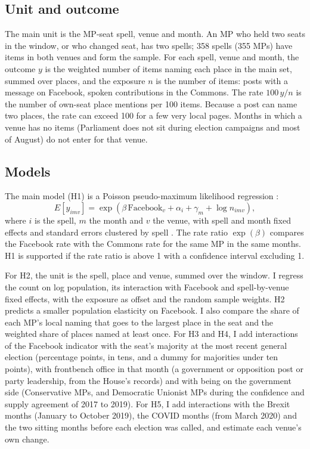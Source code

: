 \documentclass[11pt,a4paper]{article}
\begin{document}
\subsection{Unit and outcome}
The main unit is the MP-seat spell, venue and month. An MP who held two seats in the window, or who changed seat, has two spells; 358 spells (355 MPs) have items in both venues and form the sample. For each spell, venue and month, the outcome $y$ is the weighted number of items naming each place in the main set, summed over places, and the exposure $n$ is the number of items: posts with a message on Facebook, spoken contributions in the Commons. The rate $100\,y/n$ is the number of own-seat place mentions per 100 items. Because a post can name two places, the rate can exceed 100 for a few very local pages. Months in which a venue has no items (Parliament does not sit during election campaigns and most of August) do not enter for that venue.

\subsection{Models}
The main model (H1) is a Poisson pseudo-maximum likelihood regression \citep{santos2006,correia2020}:
\begin{equation}
E[y_{imv}] = \exp(\beta\,\mathrm{Facebook}_v + \alpha_i + \gamma_m + \log n_{imv}),
\end{equation}
where $i$ is the spell, $m$ the month and $v$ the venue, with spell and month fixed effects and standard errors clustered by spell \citep{cameron2015,abadie2023}. The rate ratio $\exp(\beta)$ compares the Facebook rate with the Commons rate for the same MP in the same months. H1 is supported if the rate ratio is above 1 with a confidence interval excluding 1.

For H2, the unit is the spell, place and venue, summed over the window. I regress the count on log population, its interaction with Facebook and spell-by-venue fixed effects, with the exposure as offset and the random sample weights. H2 predicts a smaller population elasticity on Facebook. I also compare the share of each MP's local naming that goes to the largest place in the seat and the weighted share of places named at least once. For H3 and H4, I add interactions of the Facebook indicator with the seat's majority at the most recent general election (percentage points, in tens, and a dummy for majorities under ten points), with frontbench office in that month (a government or opposition post or party leadership, from the House's records) and with being on the government side (Conservative MPs, and Democratic Unionist MPs during the confidence and supply agreement of 2017 to 2019). For H5, I add interactions with the Brexit months (January to October 2019), the COVID months (from March 2020) and the two sitting months before each election was called, and estimate each venue's own change.
\end{document}
